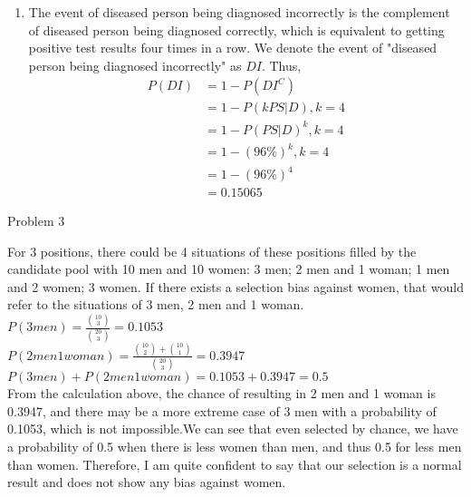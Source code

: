 \documentclass[12pt,letterpaper, onecolumn]{exam}
\begin{document}
\begin{questions}
\begin{solution}
\begin{enumerate}
            \item The event of diseased person being diagnosed incorrectly is the complement of diseased person being diagnosed correctly, which is equivalent to getting positive test results four times in a row. We denote the event of "diseased person being diagnosed incorrectly" as $DI$. Thus, 
            \begin{align*}
                P(DI) & = 1 - P(DI^C) \\
                & = 1 - P(kPS|D), k = 4 \\
                & = 1 - P(PS | D)^k, k = 4 \\
                & = 1- (96\%)^k, k = 4 \\
                & = 1 - (96\%)^4 \\
                & = 0.15065
            \end{align*}
            
        \end{enumerate}
        
    \end{solution}

    \question Problem 3
    \begin{solution}
        For 3 positions, there could be 4 situations of these positions filled by the candidate pool with 10 men and 10 women: 3 men; 2 men and 1 woman; 1 men and 2 women; 3 women. If there exists a selection bias against women, that would refer to the situations of 3 men, 2 men and 1 woman. \\
        $P(3 men) = \frac{\binom{10}{3}}{\binom{20}{3}} = 0.1053$ \\
        $P(2 men 1 woman) = \frac{\binom{10}{2} + \binom{10}{1}}{\binom{20}{3}} = 0.3947$ \\
        $P(3 men) + P(2 men 1 woman) = 0.1053 + 0.3947 = 0.5 $ \\
        From the calculation above, the chance of resulting in 2 men and 1 woman is 0.3947, and there may be a more extreme case of 3 men with a probability of 0.1053, which is not impossible.We can see that even selected by chance, we have a probability of 0.5 when there is less women than men, and thus 0.5 for less men than women.  Therefore, I am quite confident to say that our selection is a normal result and does not show any bias against women.  
    \end{solution}


\end{questions}
\end{document}
